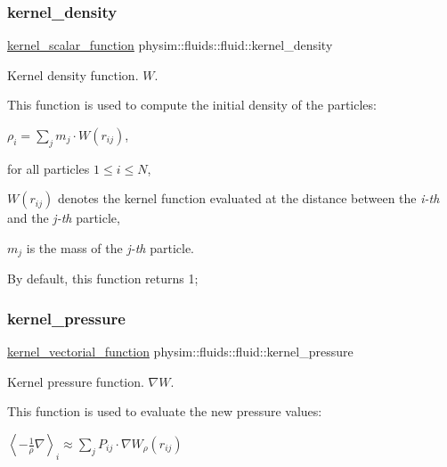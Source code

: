 \subsubsection{\texorpdfstring{kernel\+\_\+density}{kernel\_density}}
{\footnotesize\ttfamily \hyperlink{namespacephysim_1_1fluids_a22c55c76ab3fe3de79dada15e2f9c2d6}{kernel\+\_\+scalar\+\_\+function} physim\+::fluids\+::fluid\+::kernel\+\_\+density\hspace{0.3cm}{\ttfamily [protected]}}



Kernel density function. $W$. 

This function is used to compute the initial density of the particles\+:

$ \rho_i = \sum_j m_j \cdot W(r_{ij}) $,

for all particles $1 \le i \le N$,
\begin{DoxyItemize}
\item $W(r_{ij})$ denotes the kernel function evaluated at the distance between the {\itshape i-\/th} and the {\itshape j-\/th} particle,
\item $m_j$ is the mass of the {\itshape j-\/th} particle.
\end{DoxyItemize}

By default, this function returns 1; \mbox{\label{classphysim_1_1fluids_1_1fluid_ae3ccfb94b27e6a1464210d36744f16a4}} 
\subsubsection{\texorpdfstring{kernel\+\_\+pressure}{kernel\_pressure}}
{\footnotesize\ttfamily \hyperlink{namespacephysim_1_1fluids_ab109a55050c62abe9c1c23924f620754}{kernel\+\_\+vectorial\+\_\+function} physim\+::fluids\+::fluid\+::kernel\+\_\+pressure\hspace{0.3cm}{\ttfamily [protected]}}



Kernel pressure function. $\nabla W$. 

This function is used to evaluate the new pressure values\+:

$ \left\langle -\frac{1}{\rho}\nabla \right\rangle_i \approx \sum_j P_{ij} \cdot \nabla W_\rho(r_{ij}) $

